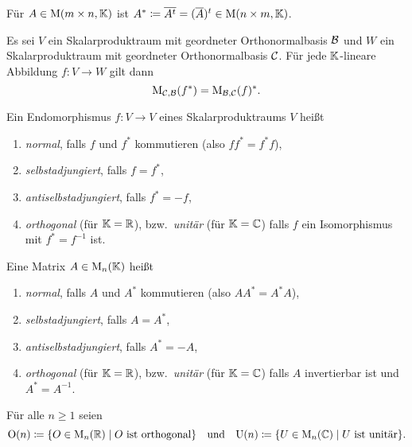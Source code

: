 \begin{definition}
  Für $A \in \mathrm{M}(m \times n, \mathbb{K})$ ist $A^* \coloneqq \overline{A^t} = (\overline{A})^t \in \mathrm{M}(n \times m, \mathbb{K})$.
\end{definition}


\begin{proposition}
  Es sei $V$ ein Skalarproduktraum mit geordneter Orthonormalbasis $\mathcal{B}$ und $W$ ein Skalarproduktraum mit geordneter Orthonormalbasis $\mathcal{C}$.
  Für jede $\mathbb{K}$-lineare Abbildung $f \colon V \to W$ gilt dann
  \[
    \mathrm{M}_{\mathcal{C}, \mathcal{B}}(f^*) = \mathrm{M}_{\mathcal{B}, \mathcal{C}}(f)^*.
  \]
\end{proposition}


\begin{definition}
  Ein Endomorphismus $f \colon V \to V$ eines Skalarproduktraums $V$ heißt
  \begin{enumerate}[leftmargin=*, label=\roman*)]
    \item
      \emph{normal}, falls $f$ und $f^*$ kommutieren (also $f f^* = f^* f$),
    \item
      \emph{selbstadjungiert}, falls $f = f^*$,
    \item
      \emph{antiselbstadjungiert}, falls $f^* = -f$,
    \item
      \emph{orthogonal} (für $\mathbb{K} = \mathbb{R}$), bzw.\ \emph{unitär} (für $\mathbb{K} = \mathbb{C}$) falls $f$ ein Isomorphismus mit $f^* = f^{-1}$ ist.
  \end{enumerate}
  Eine Matrix $A \in \mathrm{M}_n(\mathbb{K})$ heißt
  \begin{enumerate}[leftmargin=*, label=\Roman*)]
    \item
      \emph{normal}, falls $A$ und $A^*$ kommutieren (also $A A^* = A^* A$),
    \item
      \emph{selbstadjungiert}, falls $A = A^*$,
    \item
      \emph{antiselbstadjungiert}, falls $A^* = -A$,
    \item
      \emph{orthogonal} (für $\mathbb{K} = \mathbb{R}$), bzw.\ \emph{unitär} (für $\mathbb{K} = \mathbb{C}$) falls $A$ invertierbar ist und $A^* = A^{-1}$.
  \end{enumerate}
  Für alle $n \geq 1$ seien
  \[
    \mathrm{O}(n)
    \coloneqq
    \{
      O \in \mathrm{M}_n(\mathbb{R})
      \mid
      \text{$O$ ist orthogonal}
    \}
    \quad\text{und}\quad
    \mathrm{U}(n)
    \coloneqq
    \{
      U \in \mathrm{M}_n(\mathbb{C})
      \mid
      \text{$U$ ist unitär}
    \}.
  \]
\end{definition}


